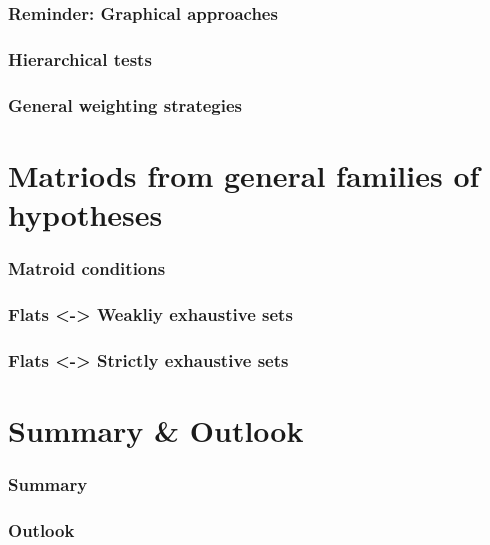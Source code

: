 \documentclass[bigger]{beamer}
\begin{document}
\begin{frame}
\frametitle{Reminder: Graphical approaches}
\end{frame}



\begin{frame}
\frametitle{Hierarchical tests}
\end{frame}



\begin{frame}
\frametitle{General weighting strategies}
\end{frame}
\section{Matriods from general families of hypotheses}



\begin{frame}
\frametitle{Matroid conditions}
\end{frame}



\begin{frame}
\frametitle{Flats <-> Weakliy exhaustive sets}
\end{frame}



\begin{frame}
\frametitle{Flats <-> Strictly exhaustive sets}
\end{frame}
\section{Summary \& Outlook}



\begin{frame}
\frametitle{Summary}
\end{frame}



\begin{frame}
\frametitle{Outlook}

\end{frame}
\end{document}
